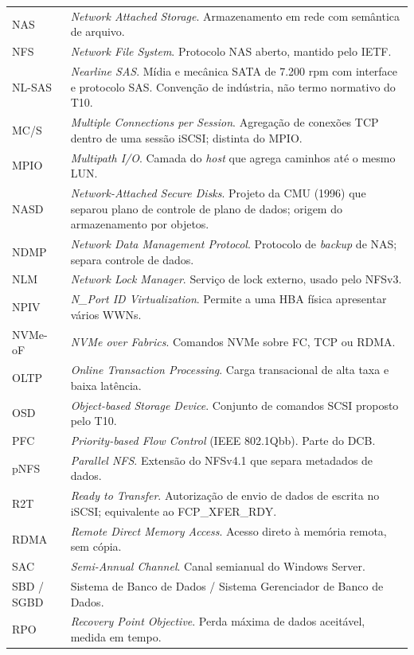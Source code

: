 \documentclass[11pt,a4paper]{article}
\begin{document}
{\begin{longtable}{@{}p{2.2cm}p{13.4cm}@{}}
NAS & \textit{Network Attached Storage}. Armazenamento em rede com semântica de arquivo. \\
NFS & \textit{Network File System}. Protocolo NAS aberto, mantido pelo IETF. \\
NL-SAS & \textit{Nearline SAS}. Mídia e mecânica SATA de 7.200 rpm com interface e protocolo SAS.
Convenção de indústria, não termo normativo do T10. \\
MC/S & \textit{Multiple Connections per Session}. Agregação de conexões TCP dentro de uma sessão
iSCSI; distinta do MPIO. \\
MPIO & \textit{Multipath I/O}. Camada do \textit{host} que agrega caminhos até o mesmo LUN. \\
NASD & \textit{Network-Attached Secure Disks}. Projeto da CMU (1996) que separou plano de controle
de plano de dados; origem do armazenamento por objetos. \\
NDMP & \textit{Network Data Management Protocol}. Protocolo de \textit{backup} de NAS; separa
controle de dados. \\
NLM & \textit{Network Lock Manager}. Serviço de lock externo, usado pelo NFSv3. \\
NPIV & \textit{N\_Port ID Virtualization}. Permite a uma HBA física apresentar vários WWNs. \\
NVMe-oF & \textit{NVMe over Fabrics}. Comandos NVMe sobre FC, TCP ou RDMA. \\
OLTP & \textit{Online Transaction Processing}. Carga transacional de alta taxa e baixa latência. \\
OSD & \textit{Object-based Storage Device}. Conjunto de comandos SCSI proposto pelo T10. \\
PFC & \textit{Priority-based Flow Control} (IEEE 802.1Qbb). Parte do DCB. \\
pNFS & \textit{Parallel NFS}. Extensão do NFSv4.1 que separa metadados de dados. \\
R2T & \textit{Ready to Transfer}. Autorização de envio de dados de escrita no iSCSI; equivalente ao
FCP\_XFER\_RDY. \\
RDMA & \textit{Remote Direct Memory Access}. Acesso direto à memória remota, sem cópia. \\
SAC & \textit{Semi-Annual Channel}. Canal semianual do Windows Server. \\
SBD / SGBD & Sistema de Banco de Dados / Sistema Gerenciador de Banco de Dados. \\
RPO & \textit{Recovery Point Objective}. Perda máxima de dados aceitável, medida em tempo. \\

\end{longtable}}
\end{document}
